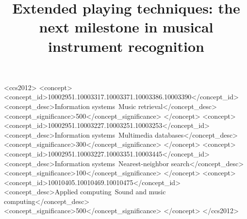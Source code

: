 \documentclass[sigconf]{acmart}
\begin{document}
%
%
\begin{CCSXML}
<ccs2012>
<concept>
<concept_id>10002951.10003317.10003371.10003386.10003390</concept_id>
<concept_desc>Information systems~Music retrieval</concept_desc>
<concept_significance>500</concept_significance>
</concept>
<concept>
<concept_id>10002951.10003227.10003251.10003253</concept_id>
<concept_desc>Information systems~Multimedia databases</concept_desc>
<concept_significance>300</concept_significance>
</concept>
<concept>
<concept_id>10002951.10003227.10003351.10003445</concept_id>
<concept_desc>Information systems~Nearest-neighbor search</concept_desc>
<concept_significance>100</concept_significance>
</concept>
<concept>
<concept_id>10010405.10010469.10010475</concept_id>
<concept_desc>Applied computing~Sound and music computing</concept_desc>
<concept_significance>500</concept_significance>
</concept>
</ccs2012>
\end{CCSXML}



\maketitle

\title{Extended playing techniques: the next milestone in musical instrument recognition}



\clearpage



\end{document}
